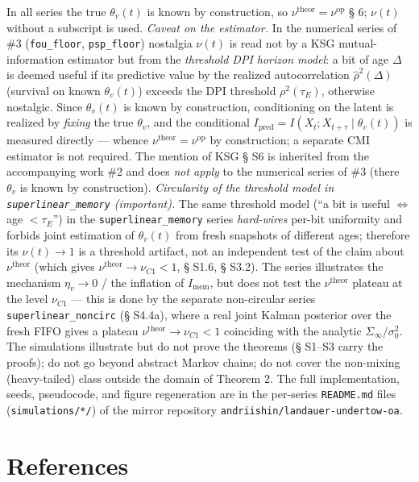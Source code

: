 \documentclass[12pt]{iopart}
\begin{document}
In all series the true \(\theta_v(t)\) is known by construction, so \(\nu^{\text{theor}} = \nu^{\text{op}}\) \cite{Andriishin2026b} § 6; \(\nu(t)\) without a subscript is used. \emph{Caveat on the estimator.} In the numerical series of \#3 (\texttt{fou\_floor}, \texttt{psp\_floor}) nostalgia \(\nu(t)\) is read not by a KSG mutual-information estimator but from the \emph{threshold DPI horizon model}: a bit of age \(\Delta\) is deemed useful if its predictive value by the realized autocorrelation \(\hat\rho^2(\Delta)\) (survival on known \(\theta_v(t)\)) exceeds the DPI threshold \(\rho^2(\tau_E)\), otherwise nostalgic. Since \(\theta_v(t)\) is known by construction, conditioning on the latent is realized by \emph{fixing} the true \(\theta_v\), and the conditional \(I_{\text{pred}} = I(X_t;X_{t+\tau}\mid\theta_v(t))\) is measured directly --- whence \(\nu^{\text{theor}} = \nu^{\text{op}}\) by construction; a separate CMI estimator is not required. The mention of KSG \cite{Andriishin2026b} § S6 is inherited from the accompanying work \#2 and does \emph{not apply} to the numerical series of \#3 (there \(\theta_v\) is known by construction). \emph{Circularity of the threshold model in \texttt{superlinear\_memory} (important).} The same threshold model (``a bit is useful \(\Leftrightarrow\) age \(< \tau_E\)'') in the \texttt{superlinear\_memory} series \emph{hard-wires} per-bit uniformity and forbids joint estimation of \(\theta_v(t)\) from fresh snapshots of different ages; therefore its \(\nu(t) \to 1\) is a threshold artifact, not an independent test of the claim about \(\nu^{\text{theor}}\) (which gives \(\nu^{\text{theor}} \to \nu_{C1} < 1\), § S1.6, § S3.2). The series illustrates the mechanism \(\eta_v \to 0\) / the inflation of \(I_{\text{mem}}\), but does not test the \(\nu^{\text{theor}}\) plateau at the level \(\nu_{C1}\) --- this is done by the separate non-circular series \texttt{superlinear\_noncirc} (§ S4.4a), where a real joint Kalman posterior over the fresh FIFO gives a plateau \(\nu^{\text{theor}} \to \nu_{C1} < 1\) coinciding with the analytic \(\Sigma_\infty/\sigma_0^2\). The simulations illustrate but do not prove the theorems (§ S1--S3 carry the proofs); do not go beyond abstract Markov chains; do not cover the non-mixing (heavy-tailed) class outside the domain of Theorem 2. The full implementation, seeds, pseudocode, and figure regeneration are in the per-series \texttt{README.md} files (\texttt{simulations/*/}) of the mirror repository \texttt{andriishin/landauer-undertow-oa}.



\section*{References}


\end{document}
